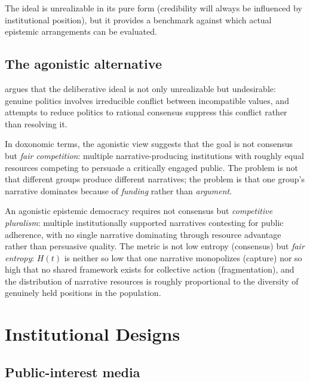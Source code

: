 The ideal is unrealizable in its pure form (credibility will always be influenced by institutional position), but it provides a benchmark against which actual epistemic arrangements can be evaluated.

\subsection{The agonistic alternative}

\textcite{mouffe2005} argues that the deliberative ideal is not only unrealizable but undesirable: genuine politics involves irreducible conflict between incompatible values, and attempts to reduce politics to rational consensus suppress this conflict rather than resolving it.

In doxonomic terms, the agonistic view suggests that the goal is not consensus but \emph{fair competition}: multiple narrative-producing institutions with roughly equal resources competing to persuade a critically engaged public.
The problem is not that different groups produce different narratives; the problem is that one group's narrative dominates because of \emph{funding} rather than \emph{argument}.

\begin{proposition}
\label{prop:agonistic}
An agonistic epistemic democracy requires not consensus but \emph{competitive pluralism}: multiple institutionally supported narratives contesting for public adherence, with no single narrative dominating through resource advantage rather than persuasive quality.
The metric is not low entropy (consensus) but \emph{fair entropy}: $H(t)$ is neither so low that one narrative monopolizes (capture) nor so high that no shared framework exists for collective action (fragmentation), and the distribution of narrative resources is roughly proportional to the diversity of genuinely held positions in the population.
\end{proposition}

\section{Institutional Designs}
\label{sec:ch32-designs}

\subsection{Public-interest media}

